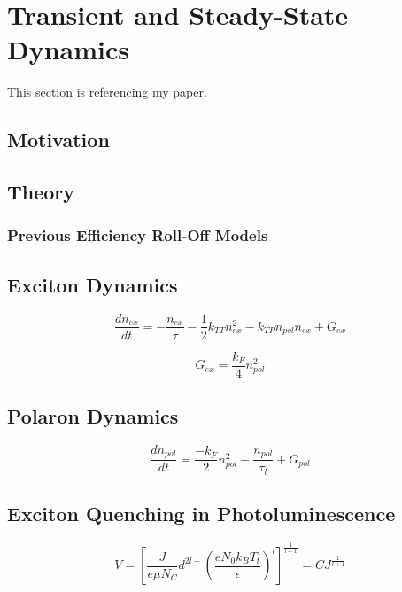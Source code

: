 \documentclass[../thesis.tex]{subfiles}
\begin{document}
\section{Transient and Steady-State Dynamics}

This section is referencing my paper.\cite{Hershey2016,Hershey2017}
\subsection{Motivation}
\subsection{Theory}
\subsubsection{Previous Efficiency Roll-Off Models}
\subsection{Exciton Dynamics}
\begin{equation}
\frac{dn_{ex}}{dt} = - \frac{n_{ex}}{\tau}-\frac{1}{2}k_{TT}n_{ex}^2-k_{TP}n_{pol}n_{ex}+G_{ex}
\label{eqn:exciton_rate}
\end{equation}

\begin{equation}
G_{ex}=\frac{k_F}{4}n_{pol}^2
\label{eqn:exciton_formation}
\end{equation}


\subsection{Polaron Dynamics}

\begin{equation}
\frac{dn_{pol}}{dt}=\frac{-k_F}{2}n_{pol}^2-\frac{n_{pol}}{\tau_l}+G_{pol}
\label{eqn:polaron_rate}
\end{equation}

\subsection{Exciton Quenching in Photoluminescence}

\begin{equation}
V=\left[ \frac{J}{e\mu N_C}d^{2l+}\left( \frac{eN_0k_BT_t}{\epsilon} \right)^l \right]^{\frac{1}{l+1}}=CJ^{\frac{1}{l+1}}
\label{eqn:ktpVoltage}
\end{equation}
\end{document}
